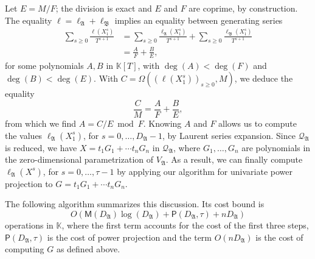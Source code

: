 \documentclass[final,1p,times,authoryear]{elsarticle}
\newcommand{\lf}{X}
\newcommand{\residueI}{\mathscr{Q}}
\def\M {\ensuremath{\mathsf{M}}}
\def\PP {\ensuremath{\mathsf{P}}}
\def\K{\mathbb{K}}
\def\K {\ensuremath{\mathbb{K}}}
\begin{document}
Let $E=M/F$; the division is exact and  $E$ and $F$ are coprime, by construction.
The equality $\ell= \ell_{\mathfrak{A}} + \ell_{\mathfrak{B}}$ implies
an equality between generating series
\begin{align*}
  \sum_{s \ge 0} \frac{\ell(X_1^s)}{T^{s+1}} & = \sum_{s \ge 0}\frac{\ell_\mathfrak{A}(X_1^s)}{T^{s+1}}  
  +\sum_{s \ge 0} \frac{\ell_\mathfrak{B}(X_1^s)}{T^{s+1}}\\
                                             & = \frac{A}{F} + \frac{B}{E},
\end{align*}
for some polynomials $A,B$ in $\K[T]$, with $\deg(A) < \deg(F)$ and
$\deg(B) < \deg(E)$. With  $C=\Omega( (\ell(X_1^s))_{s \ge 0}, M)$, we deduce the equality
$$\frac{C}{M}=\frac{A}{F} + \frac{B}{E},$$ from which we find $A = C/E
\bmod F$. Knowing $A$ and $F$ allows us to compute the values
$\ell_\mathfrak{A}(X_1^s)$, for $s=0,\dots,D_\mathfrak{A}-1$, by
Laurent series expansion.  Since $\residueI_\mathfrak{A}$ is reduced,
we have $\lf = t_1 G_1 + \cdots t_n G_n$ in $\residueI_\mathfrak{A}$,
where $G_1,\dots,G_n$ are polynomials in the zero-dimensional
parametrization of $V_\mathfrak{A}$. As a result, we can finally
compute $\ell_\mathfrak{A}(\lf^s)$, for $s=0,\dots,\tau-1$ by
applying our algorithm for univariate power projection to $G=t_1 G_1 + \cdots t_n G_n$.

The following algorithm summarizes this discussion. Its cost bound
is
\[
  O(\M(D_\mathfrak{A})\log(D_\mathfrak{A}) + \PP(D_\mathfrak{A},\tau) +nD_\mathfrak{A})
\]
operations in $\K$, where the first term accounts for the cost of the first
three steps, $\PP(D_\mathfrak{A},\tau)$ is the cost of power projection and the
term $O(nD_\mathfrak{A})$ is the cost of computing $G$ as defined above.
\end{document}
